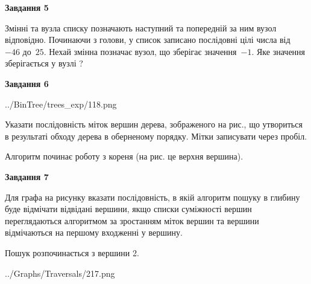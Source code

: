 \documentclass[12pt, ukrainian]{article}
\begin{document}
{\begin {large}
{\begin {center}\textbf{Завдання 5}\end {center}}\par
Змінні  та  вузла списку позначають наступний та попередній за ним вузол відповідно. Починаючи з голови, у список записано послідовні цілі числа від~$-46$ до~$25$. Нехай змінна  позначає вузол, що зберігає значення~$-1$.
Яке значення зберігається у вузлі  ?\par
\newpage

{\begin {center}\textbf{Завдання 6}\end {center}}\par

\begin{center}
	{../BinTree/trees_exp/118.png}
\end{center}
Указати послідовність міток вершин дерева, зображеного на рис., що утвориться в результаті обходу дерева в оберненому порядку. Мітки записувати через пробіл.\par Алгоритм починає роботу з кореня (на рис. це верхня вершина).\par
\newpage

{\begin {center}\textbf{Завдання 7}\end {center}}\par
Для графа на рисунку вказати послідовність, в якій алгоритм пошуку в глибину буде відмічати відвідані вершини, якщо списки суміжності вершин переглядаються алгоритмом за зростанням міток вершин та вершини відмічаються на першому вход\-женні у вершину.\par
Пошук розпочинається з вершини 2.\par

\begin{center}
	{../Graphs/Traversals/217.png}
\end{center}\par
\newpage


\end{large}}
\end{document}
